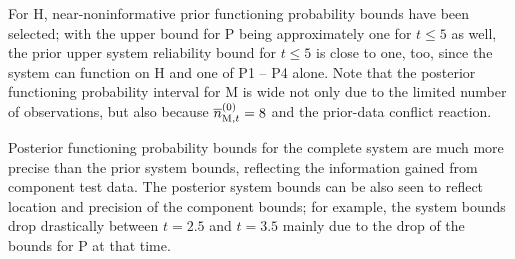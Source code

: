 \documentclass[12pt, a4paper]{elsarticle}
\begin{document}
For H, near-noninformative prior functioning probability bounds have been selected;
with the upper bound for P being approximately one for $t \le 5$ as well,
the prior upper system reliability bound for $t \le 5$ is close to one, too,
since the system can function on H and one of P1 -- P4 alone.
Note that the posterior functioning probability interval for M
is wide not only due to the limited number of observations,
but also because $\overline{n}^{(0)}_{\text{M},t} = 8$ and the prior-data conflict reaction.

Posterior functioning probability bounds for the complete system
are much more precise than the prior system bounds,
reflecting the information gained from component test data.
The posterior system bounds can be also seen to reflect location and precision of the component bounds;
for example, the system bounds drop drastically between $t=2.5$ and $t=3.5$
mainly due to the drop of the bounds for P at that time.
\end{document}
